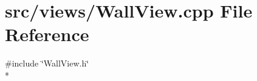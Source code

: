 \section{src/views/\-Wall\-View.cpp File Reference}
\label{_wall_view_8cpp}
{\ttfamily \#include \char`\"{}Wall\-View.\-h\char`\"{}}\\*
